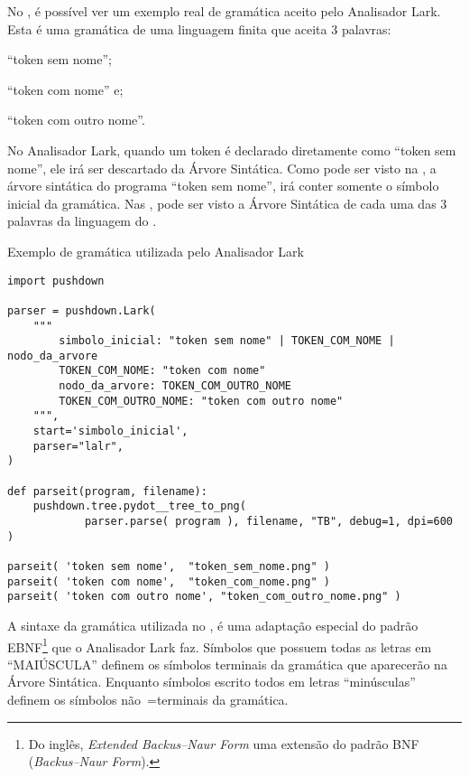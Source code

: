 No ,
é possível ver um exemplo real de gramática aceito pelo Analisador Lark.
Esta é uma gramática de uma linguagem finita que aceita 3 palavras:
\begin{inparaenum}[1)]
\item ``token sem nome'';
\item ``token com nome'' e;
\item ``token com outro nome''.
\end{inparaenum}%
No Analisador Lark,
quando um token é declarado diretamente como ``token sem nome'',
ele irá ser descartado da Árvore Sintática.
Como pode ser visto na ,
a árvore sintática do programa ``token sem nome'',
irá conter somente o símbolo inicial da gramática.
Nas ,
pode ser visto a Árvore Sintática de cada uma das 3 palavras da linguagem do .
\begin{code}
\caption{Exemplo de gramática utilizada pelo Analisador Lark}
\label{code:ExemploDeGramaticaLark}
\begin{verbatim}
import pushdown

parser = pushdown.Lark(
    """
        simbolo_inicial: "token sem nome" | TOKEN_COM_NOME | nodo_da_arvore
        TOKEN_COM_NOME: "token com nome"
        nodo_da_arvore: TOKEN_COM_OUTRO_NOME
        TOKEN_COM_OUTRO_NOME: "token com outro nome"
    """,
    start='simbolo_inicial',
    parser="lalr",
)

def parseit(program, filename):
    pushdown.tree.pydot__tree_to_png(
            parser.parse( program ), filename, "TB", debug=1, dpi=600 )

parseit( 'token sem nome',  "token_sem_nome.png" )
parseit( 'token com nome',  "token_com_nome.png" )
parseit( 'token com outro nome', "token_com_outro_nome.png" )
\end{verbatim}
\end{code}

A sintaxe da gramática utilizada no ,
é uma adaptação especial do padrão EBNF\footnote{
Do inglês,
\textit{Extended Backus–Naur Form} uma extensão do padrão BNF (\textit{Backus–Naur Form}).
}
\cite{teachingEbnf,antlrBookTerrentParr,larkGrammarReference,larkStyleCheat} que o Analisador Lark faz.
Símbolos que possuem todas as letras em ``MAIÚSCULA'' definem os símbolos terminais da gramática que aparecerão na Árvore Sintática.
Enquanto símbolos escrito todos em letras ``minúsculas'' definem os símbolos não~=terminais da gramática.

